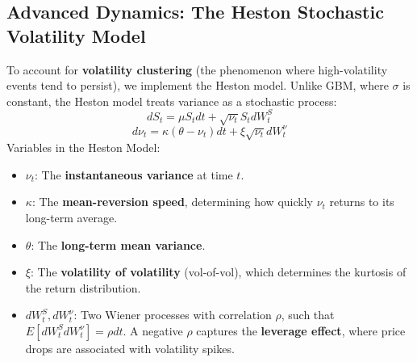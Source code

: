\subsection{Advanced Dynamics: The Heston Stochastic Volatility Model}
To account for \textbf{volatility clustering} (the phenomenon where high-volatility events tend to persist), we implement the Heston model. Unlike GBM, where $\sigma$ is constant, the Heston model treats variance as a stochastic process:
\begin{equation}
    dS_t = \mu S_t dt + \sqrt{\nu_t} S_t dW_t^S
\end{equation}
\begin{equation}
    d\nu_t = \kappa(\theta - \nu_t)dt + \xi \sqrt{\nu_t} dW_t^\nu
\end{equation}
Variables in the Heston Model:
\begin{itemize}
    \item $\nu_t$: The \textbf{instantaneous variance} at time $t$.
    \item $\kappa$: The \textbf{mean-reversion speed}, determining how quickly $\nu_t$ returns to its long-term average.
    \item $\theta$: The \textbf{long-term mean variance}.
    \item $\xi$: The \textbf{volatility of volatility} (vol-of-vol), which determines the kurtosis of the return distribution.
    \item $dW_t^S, dW_t^\nu$: Two Wiener processes with correlation $\rho$, such that $E[dW_t^S dW_t^\nu] = \rho dt$. A negative $\rho$ captures the \textbf{leverage effect}, where price drops are associated with volatility spikes.
\end{itemize}

